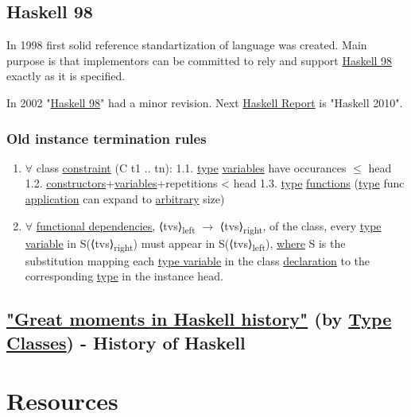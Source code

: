 \documentclass[a4paper,14pt,oneside]{book}
\begin{document}
\section{\label{orgb421e3a}Haskell 98}
\label{sec:org6714cf4}
In 1998 first solid reference standartization of language was created. Main purpose is that implementors can be committed to rely and support \hyperref[orgb421e3a]{Haskell 98} exactly as it is specified.

In 2002 "\hyperref[orgb421e3a]{Haskell 98}" had a minor revision. Next \hyperref[orgab652a6]{Haskell Report} is "Haskell 2010".

\subsection{\label{org1c134a8}Old instance termination rules}
\label{sec:orgf64f5b0}

\begin{enumerate}
\item \(\forall\) class \hyperref[org45b0f0c]{constraint} (C t1 .. tn):
1.1. \hyperref[org02707c5]{type} \hyperref[orgca34eed]{variables} have occurances \(\le\) head
1.2. \hyperref[orgf812fa7]{constructors}+\hyperref[orgca34eed]{variables}+repetitions < head
1.3. \textlnot{} \hyperref[org02707c5]{type} \hyperref[org7be92ff]{functions} (\hyperref[org02707c5]{type} func \hyperref[org4017d2d]{application} can expand to \hyperref[orgfedd576]{arbitrary} size)
\item \(\forall\) \hyperref[org7c4c3be]{functional dependencies}, ⟨tvs⟩\textsubscript{left} \(\to\) ⟨tvs⟩\textsubscript{right}, of the class, every \hyperref[org9c05413]{type variable} in S(⟨tvs⟩\textsubscript{right}) must appear in S(⟨tvs⟩\textsubscript{left}), \hyperref[orgec78505]{where} S is the substitution mapping each \hyperref[org9c05413]{type variable} in the class \hyperref[org54727be]{declaration} to the corresponding \hyperref[org02707c5]{type} in the instance head.
\end{enumerate}

\section{\href{https://typeclasses.com/timeline}{"Great moments in Haskell history"} (by \hyperref[org9ad7186]{Type Classes}) - History of Haskell}
\label{sec:orgf72207b}

\chapter{Resources}
\label{sec:orgbda866a}
\end{document}
